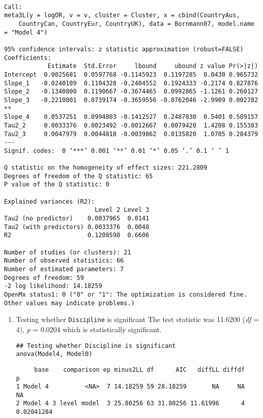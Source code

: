 \documentclass[11pt]{article}
\begin{document}
\begin{verbatim}

Call:
meta3L(y = logOR, v = v, cluster = Cluster, x = cbind(CountryAus, 
    CountryCan, CountryEur, CountryUK), data = Bornmann07, model.name = "Model 4")

95% confidence intervals: z statistic approximation (robust=FALSE)
Coefficients:
            Estimate  Std.Error     lbound     ubound z value Pr(>|z|)   
Intercept  0.0025681  0.0597768 -0.1145923  0.1197285  0.0430 0.965732   
Slope_1   -0.0240109  0.1104328 -0.2404552  0.1924333 -0.2174 0.827876   
Slope_2   -0.1340800  0.1190667 -0.3674465  0.0992865 -1.1261 0.260127   
Slope_3   -0.2210801  0.0739174 -0.3659556 -0.0762046 -2.9909 0.002782 **
Slope_4    0.0537251  0.0994803 -0.1412527  0.2487030  0.5401 0.589157   
Tau2_2     0.0033376  0.0023492 -0.0012667  0.0079420  1.4208 0.155383   
Tau2_3     0.0047979  0.0044818 -0.0039862  0.0135820  1.0705 0.284379   
---
Signif. codes:  0 ‘***’ 0.001 ‘**’ 0.01 ‘*’ 0.05 ‘.’ 0.1 ‘ ’ 1

Q statistic on the homogeneity of effect sizes: 221.2809
Degrees of freedom of the Q statistic: 65
P value of the Q statistic: 0

Explained variances (R2):
                         Level 2 Level 3
Tau2 (no predictor)    0.0037965  0.0141
Tau2 (with predictors) 0.0033376  0.0048
R2                     0.1208598  0.6606

Number of studies (or clusters): 21
Number of observed statistics: 66
Number of estimated parameters: 7
Degrees of freedom: 59
-2 log likelihood: 14.18259 
OpenMx status1: 0 ("0" or "1": The optimization is considered fine.
Other values may indicate problems.)
\end{verbatim}

\begin{enumerate}
\item Testing whether \texttt{Discipline} is significant
\label{sec:org9839d1a}
The test statistic was 11.6200 (\emph{df} = 4), \emph{p} = 0.0204 which is statistically significant.
\begin{verbatim}
## Testing whether Discipline is significant
anova(Model4, Model0)
\end{verbatim}

\begin{verbatim}
     base    comparison ep minus2LL df      AIC   diffLL diffdf          p
1 Model 4          <NA>  7 14.18259 59 28.18259       NA     NA         NA
2 Model 4 3 level model  3 25.80256 63 31.80256 11.61996      4 0.02041284
\end{verbatim}
\end{enumerate}
\end{document}
